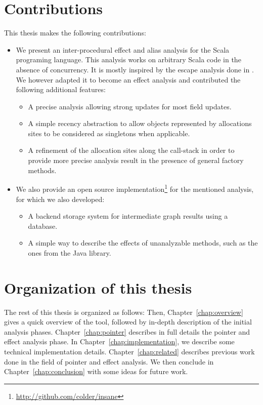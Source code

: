 \section{Contributions}
This thesis makes the following contributions:
\begin{itemize}
    \item
    We present an inter-procedural effect and alias analysis for the Scala
    programing language. This analysis works on arbitrary Scala code in the
    absence of concurrency. It is mostly inspired by the escape analysis done
    in \cite{}. We however adapted it to become an effect analysis and
    contributed the following additional features:
    \begin{itemize}
        \item A precise analysis allowing strong updates for most field
        updates.
        \item A simple recency abstraction to allow objects represented by
        allocations sites to be considered as singletons when applicable.
        \item A refinement of the allocation sites along the call-stack in
        order to provide more precise analysis result in the presence of
        general factory methods.
    \end{itemize}

    \item We also provide an open source
    implementation\footnote{\url{http://github.com/colder/insane}} for the
    mentioned analysis, for which we also developed:
    \begin{itemize}
        \item A backend storage system for intermediate graph results using a
        database.
        \item A simple way to describe the effects of unanalyzable methods, such
        as the ones from the Java library.
    \end{itemize}
\end{itemize}

\section{Organization of this thesis}
The rest of this thesis is organized as follows: Then,
Chapter~\ref{chap:overview} gives a quick overview of the tool, followed by
in-depth description of the initial analysis phases.
Chapter~\ref{chap:pointer} describes in full details the pointer and effect
analysis phase.  In Chapter~\ref{chap:implementation}, we describe some
technical implementation details. Chapter~\ref{chap:related} describes previous
work done in the field of pointer and effect analysis. We then conclude in
Chapter~\ref{chap:conclusion} with some ideas for future work.

